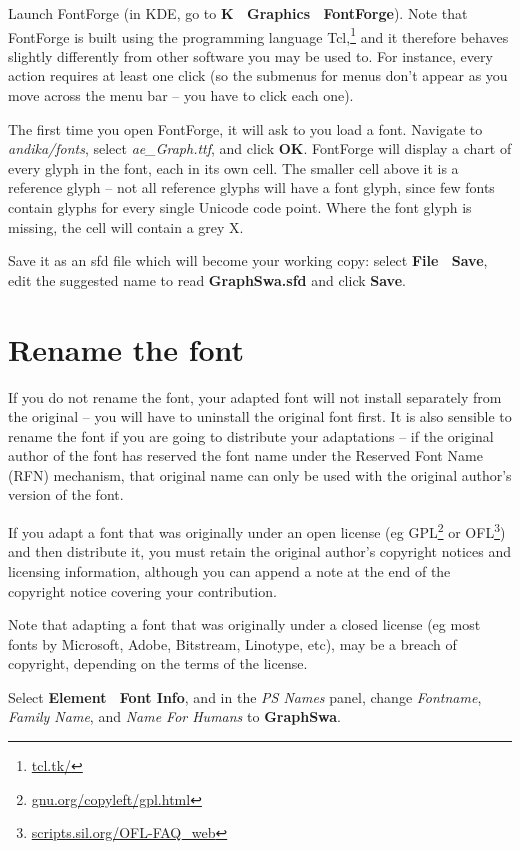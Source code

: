 Launch FontForge (in KDE, go to \textbf{K \textrightarrow\ Graphics \textrightarrow\ FontForge}).  Note that FontForge is built using the programming language Tcl,\footnote{\url{tcl.tk/}} and it therefore behaves slightly differently from other software you may be used to.  For instance, every action requires at least one click (so the submenus for menus don't appear as you move across the menu bar -- you have to click each one).

The first time you open FontForge, it will ask to you load a font.  Navigate to \textit{andika/fonts}, select \textit{ae\_Graph.ttf}, and click \textbf{OK}.  FontForge will display a chart of every glyph in the font, each in its own cell.  The smaller cell above it is a reference glyph -- not all reference glyphs will have a font glyph, since few fonts contain glyphs for every single Unicode code point.  Where the font glyph is missing, the cell will contain a grey X.

Save it as an sfd file which will become your working copy: select \textbf{File \textrightarrow\ Save}, edit the suggested name to read \textbf{GraphSwa.sfd} and click \textbf{Save}.

\section{Rename the font}

If you do not rename the font, your adapted font will not install separately from the original -- you will have to uninstall the original font first.  It is also sensible to rename the font if you are going to distribute your adaptations -- if the original author of the font has reserved the font name under the Reserved Font Name (RFN) mechanism, that original name can only be used with the original author's version of the font.

If you adapt a font that was originally under an open license (eg GPL\footnote{\url{gnu.org/copyleft/gpl.html}} or OFL\footnote{\url{scripts.sil.org/OFL-FAQ_web}}) and then distribute it, you must retain the original author's copyright notices and licensing information, although you can append a note at the end of the copyright notice covering your contribution.

Note that adapting a font that was originally under a closed license (eg most fonts by Microsoft, Adobe, Bitstream, Linotype, etc), may be a breach of copyright, depending on the terms of the license.

Select \textbf{Element \textrightarrow\ Font Info}, and in the \textit{PS Names} panel, change \textit{Fontname}, \textit{Family Name}, and \textit{Name For Humans} to \textbf{GraphSwa}.


